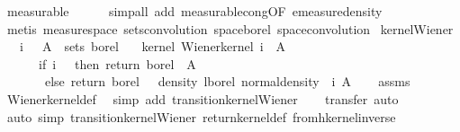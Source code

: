 \begin{isabellebody}
\ measurable\isanewline
\ \ \ \ \isamarkupfalse%
\ {\isacharparenleft}{\kern0pt}simp{\isacharunderscore}{\kern0pt}all\ add{\isacharcolon}{\kern0pt}\ measurable{\isacharunderscore}{\kern0pt}cong{\isacharbrackleft}{\kern0pt}OF\ emeasure{\isacharunderscore}{\kern0pt}density{\isacharbrackright}{\kern0pt}{\isacharparenright}{\kern0pt}\isanewline
\ \ \isamarkupfalse%
\ {\isacharparenleft}{\kern0pt}metis\ measure{\isacharunderscore}{\kern0pt}space\ sets{\isacharunderscore}{\kern0pt}convolution\ space{\isacharunderscore}{\kern0pt}borel\ space{\isacharunderscore}{\kern0pt}convolution{\isacharparenright}{\kern0pt}%
\endisatagproof
{\isafoldproof}%
%
\isadelimproof
\isanewline
%
\endisadelimproof
\isanewline
{}\isamarkupfalse%
\ kernel{\isacharunderscore}{\kern0pt}Wiener{\isacharcolon}{\kern0pt}\isanewline
\ \ \ {\isachardoublequoteopen}i\ {\isasymge}\ {}{\isachardoublequoteclose}\ {\isachardoublequoteopen}A\ {\isasymin}\ sets\ borel{\isachardoublequoteclose}\isanewline
\ \ \ {\isachardoublequoteopen}kernel\ {\isacharparenleft}{\kern0pt}Wiener{\isacharunderscore}{\kern0pt}kernel\ i{\isacharparenright}{\kern0pt}\ {\isasymomega}\ A\ {\isacharequal}{\kern0pt}\ \isanewline
\ \ \ \ \ \ {\isacharparenleft}{\kern0pt}if\ i\ {\isacharequal}{\kern0pt}\ {}\ then\ return\ borel\ {\isasymomega}\ A\isanewline
\ \ \ \ \ \ \ else\ {\isacharparenleft}{\kern0pt}return\ borel\ {\isasymomega}\ {\isasymstar}\ density\ lborel\ {\isacharparenleft}{\kern0pt}normal{\isacharunderscore}{\kern0pt}density\ {}\ i{\isacharparenright}{\kern0pt}{\isacharparenright}{\kern0pt}\ A{\isacharparenright}{\kern0pt}{\isachardoublequoteclose}\isanewline
%
\isadelimproof
\ \ %
\endisadelimproof
%
\isatagproof
{}\isamarkupfalse%
\ assms\ \isamarkupfalse%
\ Wiener{\isacharunderscore}{\kern0pt}kernel{\isacharunderscore}{\kern0pt}def\ \isamarkupfalse%
\ {\isacharparenleft}{\kern0pt}simp\ add{\isacharcolon}{\kern0pt}\ transition{\isacharunderscore}{\kern0pt}kernel{\isacharunderscore}{\kern0pt}Wiener{\isacharparenright}{\kern0pt}\isanewline
\ \ \isamarkupfalse%
\ {\isacharparenleft}{\kern0pt}transfer{\isacharcomma}{\kern0pt}\ auto{\isacharparenright}{\kern0pt}\isanewline
\ \ \isamarkupfalse%
\ {\isacharparenleft}{\kern0pt}auto\ simp{\isacharcolon}{\kern0pt}\ transition{\isacharunderscore}{\kern0pt}kernel{\isacharunderscore}{\kern0pt}Wiener\ return{\isacharunderscore}{\kern0pt}kernel{\isacharunderscore}{\kern0pt}def\ from{\isacharunderscore}{\kern0pt}hkernel{\isacharunderscore}{\kern0pt}inverse{\isacharparenright}{\kern0pt}%

\end{isabellebody}
